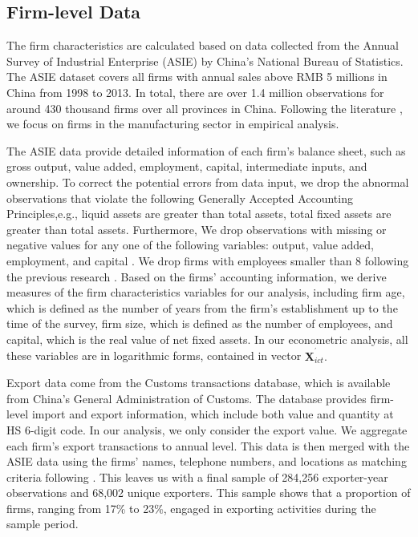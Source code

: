 \documentclass[12pt]{article}
\begin{document}
\subsection{Firm-level Data}

\label{sec:data_firm} The firm characteristics are calculated based on data
collected from the Annual Survey of Industrial Enterprise (ASIE) by China's
National Bureau of Statistics. The ASIE dataset covers all firms with annual
sales above RMB 5 millions in China from 1998 to 2013. In total, there are
over 1.4 million observations for around 430 thousand firms over all
provinces in China. Following the literature \citep[e.g.,][]{brandt2012creative, fu2021trans},
we focus on firms in the manufacturing sector in empirical analysis.

The ASIE data provide detailed information of each firm's balance sheet,
such as gross output, value added, employment, capital, intermediate inputs,
and ownership. To correct the potential errors from data input, we drop the
abnormal observations that violate the following Generally Accepted
Accounting Principles,e.g., liquid assets are greater than total assets, total
fixed assets are greater than total assets. Furthermore, We drop observations with missing or negative values for any one of
the following variables: output, value added, employment, and capital \citep{cai2009competition,yu2015processing}. We
drop firms with employees smaller than 8 following the previous research %
\citep{brandt2012creative}. Based on the firms' accounting information, we
derive measures of the firm characteristics variables for our analysis,
including firm age, which is defined as the number of years from the firm's
establishment up to the time of the survey, firm size, which is defined as
the number of employees, and capital, which is the real value of net fixed
assets. In our econometric analysis, all these variables are in logarithmic
forms, contained in vector $\mathbf{X}_{ict}^{^{\prime }}.$

Export data come from the Customs transactions database, which is available
from China's General Administration of Customs. The database provides
firm-level import and export information, which include both value and
quantity at HS 6-digit code. In our analysis, we only consider the export value. We aggregate each firm's export transactions to annual level. This data is then merged with the ASIE data using the firms'
names, telephone numbers, and locations as matching criteria following \citep{yu2015processing}. This leaves us with a final sample of 284,256 exporter-year observations and 68,002 unique exporters. This sample shows that a proportion of firms, ranging from 17\% to 23\%, engaged in exporting activities during the sample period.
\end{document}
